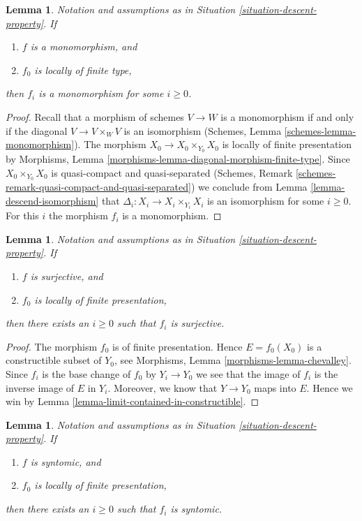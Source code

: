 \documentclass{stacks-project}
\theoremstyle{plain}
\newtheorem{lemma}[subsection]{Lemma}
\theoremstyle{definition}
\theoremstyle{remark}
\numberwithin{equation}{subsection}
\begin{document}
\begin{lemma}
\label{lemma-descend-monomorphism}
Notation and assumptions as in Situation \ref{situation-descent-property}.
If
\begin{enumerate}
\item $f$ is a monomorphism, and
\item $f_0$ is locally of finite type,
\end{enumerate}
then $f_i$ is a monomorphism for some $i \geq 0$.
\end{lemma}

\begin{proof}
Recall that a morphism of schemes $V \to W$ is a monomorphism if and
only if the diagonal $V \to V \times_W V$ is an isomorphism
(Schemes, Lemma \ref{schemes-lemma-monomorphism}).
The morphism $X_0 \to X_0 \times_{Y_0} X_0$ is locally of finite
presentation by
Morphisms, Lemma \ref{morphisms-lemma-diagonal-morphism-finite-type}.
Since $X_0 \times_{Y_0} X_0$ is quasi-compact and quasi-separated
(Schemes, Remark \ref{schemes-remark-quasi-compact-and-quasi-separated})
we conclude from
Lemma \ref{lemma-descend-isomorphism}
that $\Delta_i : X_i \to X_i \times_{Y_i} X_i$ is an isomorphism for
some $i \geq 0$. For this $i$ the morphism $f_i$ is a monomorphism.
\end{proof}

\begin{lemma}
\label{lemma-descend-surjective}
Notation and assumptions as in Situation \ref{situation-descent-property}.
If
\begin{enumerate}
\item $f$ is surjective, and
\item $f_0$ is locally of finite presentation,
\end{enumerate}
then there exists an $i \geq 0$ such that $f_i$ is surjective.
\end{lemma}

\begin{proof}
The morphism $f_0$ is of finite presentation.
Hence $E = f_0(X_0)$ is a constructible subset of $Y_0$, see
Morphisms, Lemma \ref{morphisms-lemma-chevalley}.
Since $f_i$ is the base change of $f_0$ by
$Y_i \to Y_0$ we see that the image of $f_i$ is the
inverse image of $E$ in $Y_i$. Moreover, we know that
$Y \to Y_0$ maps into $E$. Hence we win by
Lemma \ref{lemma-limit-contained-in-constructible}.
\end{proof}

\begin{lemma}
\label{lemma-descend-syntomic}
Notation and assumptions as in Situation \ref{situation-descent-property}.
If
\begin{enumerate}
\item $f$ is syntomic, and
\item $f_0$ is locally of finite presentation,
\end{enumerate}
then there exists an $i \geq 0$ such that $f_i$ is syntomic.
\end{lemma}
\end{document}
